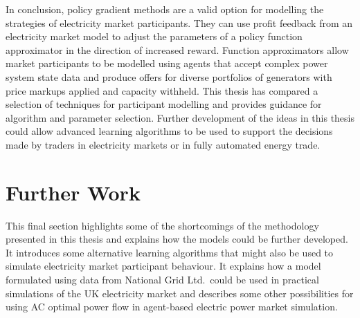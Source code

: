 
In conclusion, policy gradient methods are a valid option for modelling the
strategies of electricity market participants.  They can use profit feedback
from an electricity market model to adjust the parameters of a policy function
approximator in the direction of increased reward.  Function approximators allow
market participants to be modelled using agents that accept complex power system
state data and produce offers for diverse portfolios of generators with
price markups applied and capacity withheld.  This thesis has compared
a selection of techniques for participant modelling and provides guidance for
algorithm and parameter selection.
Further development of the ideas in this thesis could allow advanced learning
algorithms to be used to support the decisions made by traders in electricity
markets or in fully automated energy trade.

\section{Further Work}
\label{sec:furtherwork}
This final section highlights some of the shortcomings of the methodology
presented in this thesis and explains how the models could be further developed.
It introduces some alternative learning algorithms that might also be used to
simulate electricity market participant behaviour.
It explains how a model formulated using data from National Grid Ltd.~could be
used in practical simulations of the UK electricity market and describes some
other possibilities for using AC optimal power flow in agent-based electric
power market simulation.

